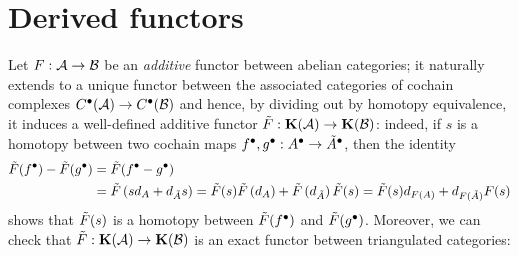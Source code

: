 
\section{Derived functors}\label{Derived-categories}

Let $F : \mathcal{A} \to \mathcal{B}$ be an \emph{additive} functor 
between abelian categories; it naturally extends
to a unique functor between the associated categories of
cochain complexes $C^{\bullet}(\mathcal{A}) \to C^{\bullet}(\mathcal{B})$
and hence, by dividing out by homotopy equivalence,
it induces a well-defined additive functor 
$\Tilde{F}:{\normalfont\textbf{K}}(\mathcal{A}) \to {\normalfont\textbf{K}}(\mathcal{B})$:
indeed, if $s$ is a homotopy between two
cochain maps $f^{\bullet},g^{\bullet}:A^{\bullet} \to \Tilde{A}^{\bullet}$, 
then the identity
\begin{align*}
    \Tilde{F}(f^{\bullet}) - \Tilde{F}(g^{\bullet})
    &= \Tilde{F}(f^{\bullet} - g^{\bullet}) \\
    &= \Tilde{F}\left(sd_{A}+d_{\Tilde{A}}s\right) 
    = \Tilde{F}(s)\Tilde{F}\left(d_{A}\right) + \Tilde{F}\left(d_{\Tilde{A}}\right)\Tilde{F}(s)
    = \Tilde{F}(s)d_{F(A)} + d_{F(\Tilde{A})}F(s)
\end{align*}
shows that $\Tilde{F}(s)$ is a homotopy between
$\Tilde{F}(f^{\bullet})$ and $\Tilde{F}(g^{\bullet})$.
Moreover, we can check that 
$\Tilde{F}:{\normalfont\textbf{K}}(\mathcal{A}) \to {\normalfont\textbf{K}}(\mathcal{B})$ is an
exact functor between triangulated categories:
